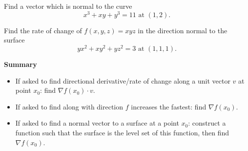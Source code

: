 \documentclass[openany]{book}
\begin{document}
\begin{prob}[2.6, Q6]
Find a vector which is normal to the curve  
\[
x^3 + xy + y^3 = 11 \text{ at } (1, 2).
\]
\end{prob}



\begin{prob}[2.6, Q7]
Find the rate of change of \( f(x, y, z) = xyz \) in the direction normal to the surface  
\[
yx^2 + xy^2 + yz^2 = 3 \text{ at } (1, 1, 1).
\]
\end{prob}

\noindent 
\textbf{Summary}
\begin{itemize}
    \item If asked to find directional derivative/rate of change along a unit vector $v$ at point $x_0$: find $\nabla f(x_0)\cdot v$.
    \item If asked to find along with direction $f$ increases the fastest: find $\nabla f(x_0)$.
    \item If asked to find a normal vector to a surface at a point $x_0$: construct a function such that the surface is the level set of this function, then find $\nabla f(x_0)$.
\end{itemize}
\end{document}
